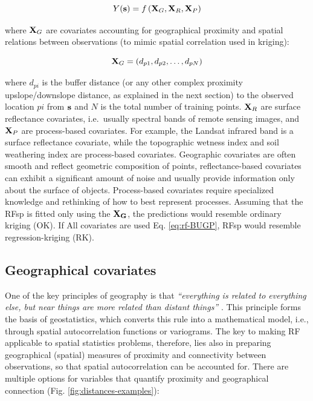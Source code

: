 \documentclass[graybox,natbib,nospthms,UStrade]{svmono}
\begin{document}
\begin{equation}
Y({{\bf s}}) = f \left( {{\bf X}_G}, {{\bf X}_R}, {{\bf X}_P} \right)
\label{eq:rf-BUGP}
\end{equation}

where \({{\bf X}_G}\) are covariates accounting for geographical proximity
and spatial relations between observations (to mimic spatial correlation
used in kriging):

\begin{equation}
{{\bf X}_G} = \left( d_{p1}, d_{p2}, \ldots , d_{pN} \right)
\end{equation}

where \(d_{pi}\) is the buffer distance (or any other complex proximity
upslope/downslope distance, as explained in the next section) to the
observed location \(pi\) from \({\bf s}\) and \(N\) is the total number of
training points. \({{\bf X}_R}\) are surface reflectance covariates,
i.e.~usually spectral bands of remote sensing images, and \({{\bf X}_P}\) are
process-based covariates. For example, the Landsat infrared band is a
surface reflectance covariate, while the topographic wetness index and
soil weathering index are process-based covariates. Geographic
covariates are often smooth and reflect geometric composition of points,
reflectance-based covariates can exhibit a significant amount of noise and
usually provide information only about the surface of objects. Process-based
covariates require specialized knowledge and rethinking of how to
best represent processes. Assuming that the RFsp is fitted only using the
\({\bf {X}_G}\), the predictions would resemble ordinary kriging (OK). If All covariates are
used Eq. \eqref{eq:rf-BUGP}, RFsp would resemble regression-kriging (RK).

\hypertarget{geographical-covariates}{%
\subsection{Geographical covariates}\label{geographical-covariates}}

One of the key principles of geography is that \emph{``everything is related
to everything else, but near things are more related than distant
things''} \citep{miller2004tobler}. This principle forms the basis of
geostatistics, which converts this rule into a mathematical model, i.e.,
through spatial autocorrelation functions or variograms. The key to
making RF applicable to spatial statistics problems, therefore, lies also in
preparing geographical (spatial) measures of proximity and connectivity between
observations, so that spatial autocorrelation can be accounted for. There
are multiple options for variables that quantify proximity and geographical
connection (Fig. \ref{fig:distances-examples}):
\end{document}
